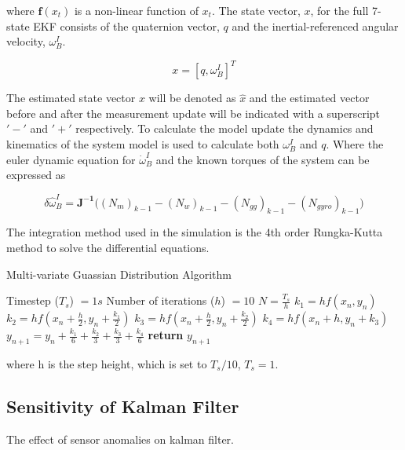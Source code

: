 \documentclass[letterpaper, 10 pt, conference]{ieeeconf}  %
\begin{document}
where $\mathbf{f}(x_t)$ is a non-linear function of $x_t$. The state vector, $x$, for the full 7-state EKF consists of the quaternion vector, $q$ and the inertial-referenced angular velocity, $\omega_B^I$.

\begin{equation}
x = [q, \omega_B^I]^T
\end{equation}

The estimated state vector $x$ will be denoted as $\hat{x}$ and the estimated vector before and after the measurement update will be indicated with a superscript $'-'$ and $'+'$ respectively. To calculate the model update the dynamics and kinematics of the system model is used to calculate both $\omega_B^I$ and $q$. Where the euler dynamic equation for $\dot{\omega}_B^I$ and the known torques of the system can be expressed as

\begin{equation}
\delta \hat{\omega}_B^I = \mathbf{J^{-1}}\big((N_m)_{k-1} - (N_w)_{k-1} - (N_{gg})_{k-1} - (N_{gyro})_{k-1} \big)
\end{equation}

The integration method used in the simulation is the 4th order Rungka-Kutta method to solve the differential equations.

\begin{algorithm}
	\caption[Multi-variate Guassian Distribution]{Multi-variate Guassian Distribution Algorithm}
	\label{alg}
\begin{algorithmic}[1]
	\State Timestep ($T_s$) $= 1s$
	\State Number of iterations ($h$) $= 10$
	\State $N = \frac{T_s}{h}$
	\State \texttt{$k_1 = hf(x_n, y_n)$}
	\State \texttt{$k_2 = hf(x_n + \frac{h}{2}, y_n + \frac{k_1}{2})$}
	\State \texttt{$k_3 = hf(x_n + \frac{h}{2}, y_n + \frac{k_2}{2})$}
	\State \texttt{$k_4 = hf(x_n + h, y_n + k_3)$}
	\State \texttt{$y_{n+1}=y_n + \frac{k_1}{6} + \frac{k_2}{3} + \frac{k_3}{3} + \frac{k_4}{6}$}
	\EndFor
	\State \textbf{return} $y_{n+1}$

\end{algorithmic}

\end{algorithm}

where h is the step height, which is set to $T_s/10$, $T_s = 1$. 



\subsection{Sensitivity of Kalman Filter}
The effect of sensor anomalies on kalman filter.
\end{document}
